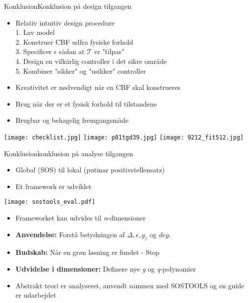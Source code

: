 \begin{frame}{Konklusion}{Konklusion på design tilgangen}
\begin{itemize}
	\item Relativ intuitiv design procedure \\	\vspace*{0.08cm}
	\scriptsize {\color{white}{m}} 1. Lav model \\	
    \scriptsize {\color{white}{m}} 2. Konstruer CBF udfra fysiske forhold \\	
    \scriptsize {\color{white}{m}} 3. Specificer $\epsilon$ sådan at $\mathcal{T}$ er "tilpas" \\	
    \scriptsize {\color{white}{m}} 4. Design en vilkårlig controller i det sikre område \\ 	
    \scriptsize {\color{white}{m}} 5. Kombiner "sikker" og "usikker" controller \\
	\item \normalsize Kreativitet er nødvendigt når en CBF skal konstrueres
	\item Brug når der er et fysisk forhold til tilstandene
	\item Brugbar og behagelig fremgangsmåde
\end{itemize}
\vspace*{0.2cm}
\texttt{[image: checklist.jpg]} \hspace*{0.2cm}
\texttt{[image: p01tgd39.jpg]} \hspace*{0.2cm}
\texttt{[image: 9212\_fit512.jpg]}
\end{frame}



\begin{frame}{Konklusion}{konklusion på analyse tilgangen}
\begin{itemize}
	\item Global (SOS) til lokal (putinar positivstellensatz)
	\item Et framework er udviklet
\end{itemize}

\texttt{[image: sostools\_eval.pdf]}

\begin{itemize}
	\item Frameworket kan udvides til \textit{n}-dimensioner
	\item \textbf{Anvendelse:} Forstå betydningen af $\Delta, \epsilon, g_j$ og $deg$.
	\item \textbf{Budskab:} Når en grøn løsning er fundet - Stop
	\item \textbf{Udvidelse i dimensioner:} Definere nye \textit{g} og \textit{q}-polynomier 
	\item Abstrakt teori er analyseret, anvendt sammen med SOSTOOLS og en guide er udarbejdet
\end{itemize}

\end{frame}

